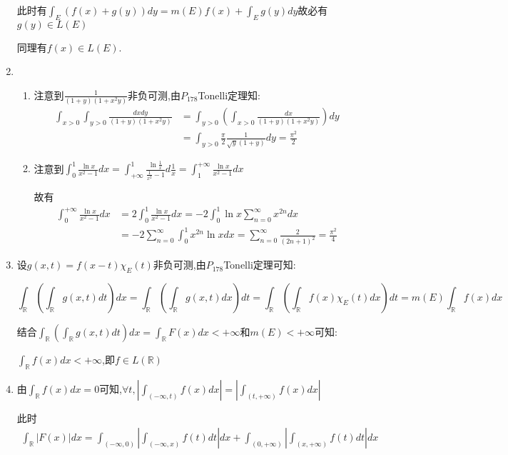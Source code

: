 \documentclass[UTF8, a4paper, 12pt, oneside, onecolumn]{article}
\numberwithin{equation}{section}
\numberwithin{figure}{section}
\numberwithin{table}{section}
\theoremstyle{nonumberplain}	%
\theoremstyle{plain}	%
\theoremstyle{plain}	%
\theoremstyle{plain}	%
\theoremstyle{plain}	%
\theoremstyle{nonumberplain}
\begin{document}
\begin{enumerate}
	此时有$\displaystyle\int_{E}( f(x)+g(y) )dy=m(E)f(x)+\int_{E}g(y)dy$故必有$g(y)\in L(E)$
	
	同理有$f(x)\in L(E).$
	\item \begin{enumerate}
		\item 注意到$\displaystyle\frac{1}{(1+y)(1+x^2y)}$非负可测,由$P_{178}$Tonelli定理知:
		\begin{align*}
			\displaystyle\int_{x>0}\int_{y>0}\frac{dxdy}{(1+y)(1+x^2y)} &= \int_{y>0}\left(\int_{x>0}\frac{dx}{(1+y)(1+x^2y)}\right)dy\\
			&= \int_{y>0}\frac{\pi}{2}\frac{1}{\sqrt{y}(1+y)}dy=\frac{\pi^2}{2}
		\end{align*}
		\item 注意到$\displaystyle\int_0^1\frac{\ln x}{x^2-1}dx=\int_{+\infty}^{1}\frac{\ln \frac{1}{x} }{\frac{1}{x^2}-1  }d\frac{1}{x}=\int_1^{+\infty}\frac{\ln x}{x^2-1}dx$
		
		故有
		\begin{align*}
			\displaystyle\int_0^{+\infty}\frac{\ln x}{x^2-1}dx &=2\int_0^1\frac{\ln x}{x^2-1}dx=-2\int_0^1\ln x\sum_{n=0}^{\infty}x^{2n}dx\\
			&=-2\sum_{n=0}^{\infty}\int_0^1 x^{2n}\ln xdx=\sum_{n=0}^{\infty}\frac{2}{(2n+1)^2}=\frac{\pi^2}{4}
		\end{align*}
	\end{enumerate}
	\item 设$g(x,t)=f(x-t)\chi_E(t) $非负可测,由$P_{178}$Tonelli定理可知:
	
	$$\int_{\mathbb{R}}(\int_{\mathbb{R}}g(x,t)dt)dx=\int_{\mathbb{R}}(\int_{\mathbb{R}}g(x,t)dx)dt=\int_{\mathbb{R}}(\int_{\mathbb{R}}f(x)\chi_E(t)dx)dt=m(E)\int_{\mathbb{R}}f(x)dx$$
	
	结合$\displaystyle\int_{\mathbb{R}}(\int_{\mathbb{R}}g(x,t)dt)dx=\int_{\mathbb{R}}F(x)dx<+\infty$和$m(E)<+\infty$可知:
	
	$\displaystyle\int_{\mathbb{R}}f(x)dx<+\infty$,即$f\in L(\mathbb{R})$
	
	\item 由$\displaystyle\int_{\mathbb{R}}f(x)dx=0$可知,$\displaystyle\forall t,\left|\int_{(-\infty,t)}f(x)dx\right|=\left|\int_{(t,+\infty)}f(x)dx\right|$
	
	此时
	\begin{align*}
		\displaystyle\int_{\mathbb{R}}|F(x)|dx=\int_{(-\infty,0)}\left|\int_{(-\infty,x)}f(t)dt\right|dx+\int_{(0,+\infty)}\left|\int_{(x,+\infty)}f(t)dt\right|dx
	\end{align*}
	

\end{enumerate}
\end{document}
